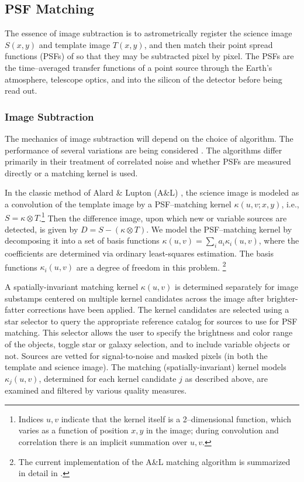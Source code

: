 \subsection{PSF Matching}
\label{sec:acPSFMatching}

The essence of image subtraction is to astrometrically register the science image $S(x,y)$ and template image $T(x,y)$, and then match their point spread functions (PSFs) of so that they may be subtracted pixel by pixel. The PSFs are the time--averaged transfer functions of a point source through the Earth's atmosphere, telescope optics, and into the silicon of the detector before being read out.

\subsubsection{Image Subtraction}
\label{sec:acImageSubtraction}
The mechanics of image subtraction will depend on the choice of algorithm.  The performance of several variations are being considered .  The algorithms differ primarily in their treatment of correlated noise and whether PSFs are measured directly or a matching kernel is used.

In the classic method of Alard \& Lupton (A\&L) \citep{1998ApJ...503..325A}, the
science image is modeled as a convolution of the template image by a
PSF--matching kernel $\kappa(u,v;x,y)$, i.e., $S = \kappa \otimes
T$.\footnote{Indices $u,v$ indicate that the kernel itself is a
2--dimensional function, which varies as a function of position $x,y$ in
the image; during convolution and correlation there is an implicit
summation over $u,v$.} Then the difference image, upon which new or
variable sources are detected, is given by $D = S - (\kappa \otimes T)$.
We model the PSF--matching kernel by decomposing it into a set of basis
functions $\kappa(u,v) = \sum_i a_i \kappa_i(u,v)$, where the coefficients
are determined via ordinary least-squares estimation.  The basis functions
$\kappa_i(u,v)$ are a degree of freedom in this problem.
\footnote{The current implementation of the A\&L matching algorithm is
summarized in detail in .}

A spatially-invariant matching kernel $\kappa(u,v)$ is determined separately for image substamps centered on multiple kernel candidates across the image after brighter-fatter corrections have been applied.  The kernel candidates are selected using a star selector to query the appropriate reference catalog for sources to use for PSF matching. This selector allows the user to specify the brightness and color range of the objects, toggle star or galaxy selection, and to include variable objects or not. Sources are vetted for signal-to-noise and masked pixels (in both the template and science image). The matching (spatially-invariant) kernel models $\kappa_j(u,v)$, determined for each kernel candidate $j$ as described above, are examined and filtered by various quality measures.

